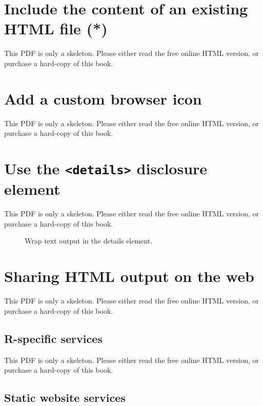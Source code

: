 \documentclass[
  11pt,
]{krantz}
\begin{document}
\section{Include the content of an existing HTML file (*)}\label{include-html}

This PDF is only a skeleton. Please either read the free online HTML version, or purchase a hard-copy of this book.

\section{Add a custom browser icon}\label{favicon}

This PDF is only a skeleton. Please either read the free online HTML version, or purchase a hard-copy of this book.

\section{\texorpdfstring{Use the \texttt{\textless{}details\textgreater{}} disclosure element}{Use the \textless details\textgreater{} disclosure element}}\label{details-tag}

This PDF is only a skeleton. Please either read the free online HTML version, or purchase a hard-copy of this book.

\begin{figure}\caption{Wrap text output in the details element.}\end{figure}

\section{Sharing HTML output on the web}\label{html-share}

This PDF is only a skeleton. Please either read the free online HTML version, or purchase a hard-copy of this book.

\subsection{R-specific services}\label{r-specific-services}

This PDF is only a skeleton. Please either read the free online HTML version, or purchase a hard-copy of this book.

\subsection{Static website services}\label{static-website-services}
\end{document}
